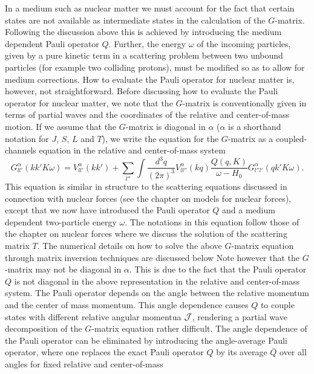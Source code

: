 In a medium such as nuclear 
matter we must account
for the fact that certain states are not available as intermediate
states in the calculation of the $G$-matrix.
Following the discussion above
this is achieved by introducing the medium
dependent Pauli operator $Q$. Further, the
energy $\omega$ of the incoming particles, given by a pure kinetic
term in a scattering problem between two unbound particles (for example two colliding protons), must be modified so as to allow
for medium corrections.
How to evaluate the Pauli operator for
nuclear matter is, however, not straightforward.
Before discussing how to evaluate the Pauli operator for nuclear matter,
we note that the $G$-matrix
is conventionally given in terms of partial waves and
the coordinates of the relative and center-of-mass motion.
If we assume that the $G$-matrix is diagonal in $\alpha$ ($\alpha$ is a shorthand
notation for $J$, $S$, $L$ and $T$), we  write the equation for the $G$-matrix as a 
coupled-channels equation in the relative and center-of-mass system
\begin{equation}
   G_{ll'}^{\alpha}(kk'K\omega )=V_{ll'}^{\alpha}(kk')
   +\sum_{l''}\int \frac{d^3 q}{(2\pi )^3}V_{ll''}^{\alpha}(kq)
   \frac{Q(q,K)}{\omega -H_0}
   G_{l''l'}^{\alpha}(qk'K\omega).
   \label{eq:gnonrel}
\end{equation}
This equation is similar in structure to the scattering
equations discussed in connection with nuclear forces (see the chapter on models for nuclear forces), except that we now have
introduced the Pauli operator $Q$ and a medium dependent two-particle
energy $\omega$. The notations in this equation follow those of the chapter on nuclear forces
where we discuss the solution of the scattering
matrix $T$.
The numerical details on how to solve the above $G$-matrix
equation through matrix inversion techniques are discussed below
Note however that the $G$-matrix may not be diagonal in $\alpha$.
This is due to the fact that the
Pauli operator $Q$ is not diagonal
in the above representation in the relative and center-of-mass
system. The Pauli operator depends on the
angle between the relative momentum and the center of mass momentum.
This angle dependence causes $Q$ to couple states with different
relative angular
momentua ${\cal J}$, rendering  a partial wave decomposition of the $G$-matrix equation 
rather difficult.
The angle dependence of the Pauli operator
can be eliminated by introducing the angle-average
Pauli operator, where one replaces the exact Pauli operator $Q$
by its average $\bar{Q}$ over all angles for fixed relative and center-of-mass
